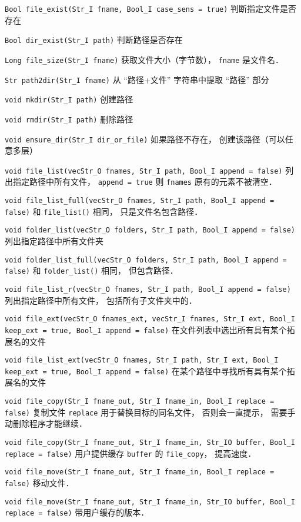 
\verb|Bool file_exist(Str_I fname, Bool_I case_sens = true)| 判断指定文件是否存在

\verb|Bool dir_exist(Str_I path)| 判断路径是否存在

\verb|Long file_size(Str_I fname)| 获取文件大小（字节数）， \verb|fname| 是文件名．

\verb|Str path2dir(Str_I fname)| 从 “路径+文件” 字符串中提取 “路径” 部分

\verb|void mkdir(Str_I path)| 创建路径

\verb|void rmdir(Str_I path)| 删除路径

\verb|void ensure_dir(Str_I dir_or_file)| 如果路径不存在， 创建该路径（可以任意多层）

\verb|void file_list(vecStr_O fnames, Str_I path, Bool_I append = false)| 列出指定路径中所有文件， \verb|append = true| 则 \verb|fnames| 原有的元素不被清空．

\verb|void file_list_full(vecStr_O fnames, Str_I path, Bool_I append = false)| 和 \verb|file_list()| 相同， 只是文件名包含路径．

\verb|void folder_list(vecStr_O folders, Str_I path, Bool_I append = false)| 列出指定路径中所有文件夹

\verb|void folder_list_full(vecStr_O folders, Str_I path, Bool_I append = false)| 和 \verb|folder_list()| 相同， 但包含路径．

\verb|void file_list_r(vecStr_O fnames, Str_I path, Bool_I append = false)| 列出指定路径中所有文件， 包括所有子文件夹中的．

\verb|void file_ext(vecStr_O fnames_ext, vecStr_I fnames, Str_I ext, Bool_I keep_ext = true, Bool_I append = false)| 在文件列表中选出所有具有某个拓展名的文件

\verb|void file_list_ext(vecStr_O fnames, Str_I path, Str_I ext, Bool_I keep_ext = true, Bool_I append = false)| 在某个路径中寻找所有具有某个拓展名的文件

\verb|void file_copy(Str_I fname_out, Str_I fname_in, Bool_I replace = false)| 复制文件 \verb|replace| 用于替换目标的同名文件， 否则会一直提示， 需要手动删除程序才能继续．

\verb|void file_copy(Str_I fname_out, Str_I fname_in, Str_IO buffer, Bool_I replace = false)| 用户提供缓存 \verb|buffer| 的 \verb|file_copy|， 提高速度．

\verb|void file_move(Str_I fname_out, Str_I fname_in, Bool_I replace = false)| 移动文件．

\verb|void file_move(Str_I fname_out, Str_I fname_in, Str_IO buffer, Bool_I replace = false)| 带用户缓存的版本．


